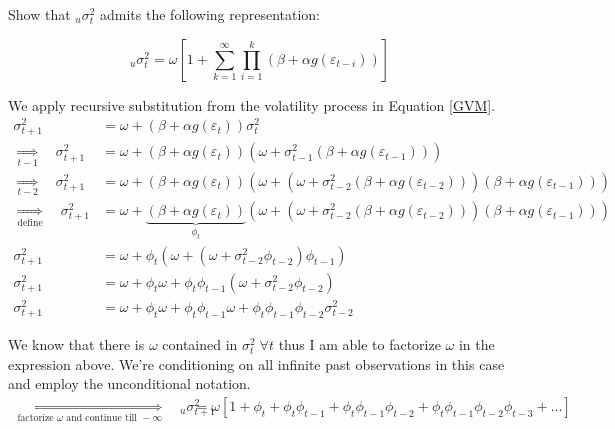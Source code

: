 \documentclass{EconHomework}
\begin{document}
\begin{tcolorbox}[colback=white]
Show that $_{u}\sigma_{t}^{2}$ admits the following representation: 

\begin{equation*}
    _{u}\sigma_{t}^{2}=\omega\left[1+\sum_{k=1}^{\infty}\prod_{i=1}^{k}\left(\beta+\alpha g\left(\varepsilon_{t-i}\right)\right)\right]
\end{equation*}
\end{tcolorbox}


We apply recursive substitution from the volatility process in Equation \ref{GVM}.
\begin{align*}
    \sigma_{t+1}^{2} & =\omega+\left(\beta+\alpha g\left(\varepsilon_{t}\right)\right)\sigma_{t}^{2}\\
    \underset{t-1}{\Longrightarrow}\quad\sigma_{t+1}^{2} & =\omega+\left(\beta+\alpha g\left(\varepsilon_{t}\right)\right)\left(\omega+\sigma_{t-1}^{2}\left(\beta+\alpha g\left(\varepsilon_{t-1}\right)\right)\right)\\
    \underset{t-2}{\Longrightarrow}\quad\sigma_{t+1}^{2} & =\omega+\left(\beta+\alpha g\left(\varepsilon_{t}\right)\right)\left(\omega+\left(\omega+\sigma_{t-2}^{2}\left(\beta+\alpha g\left(\varepsilon_{t-2}\right)\right)\right)\left(\beta+\alpha g\left(\varepsilon_{t-1}\right)\right)\right)\\
    \underset{\text{define}}{\Longrightarrow}\quad\sigma_{t+1}^{2} & =\omega+\underbrace{\left(\beta+\alpha g\left(\varepsilon_{t}\right)\right)}_{\phi_{t}}\left(\omega+\left(\omega+\sigma_{t-2}^{2}\left(\beta+\alpha g\left(\varepsilon_{t-2}\right)\right)\right)\left(\beta+\alpha g\left(\varepsilon_{t-1}\right)\right)\right)\\
    \sigma_{t+1}^{2} & =\omega+\phi_{t}\left(\omega+\left(\omega+\sigma_{t-2}^{2}\phi_{t-2}\right)\phi_{t-1}\right)\\
    \sigma_{t+1}^{2} & =\omega+\phi_{t}\omega+\phi_{t}\phi_{t-1}\left(\omega+\sigma_{t-2}^{2}\phi_{t-2}\right)\\
    \sigma_{t+1}^{2} & =\omega+\phi_{t}\omega+\phi_{t}\phi_{t-1}\omega+\phi_{t}\phi_{t-1}\phi_{t-2}\sigma_{t-2}^{2}
\end{align*}

We know that there is $\omega$ contained in $\sigma_{t}^{2}\;\forall t$
thus I am able to factorize $\omega$ in the expression above. We're
conditioning on all infinite past observations in this case and employ the
unconditional notation.
\begin{align*}
    \underset{\text{factorize }\omega\text{ and continue till }-\infty}{\Longrightarrow}\quad{}_{u}\sigma_{t+1}^{2} & =\omega\left[1+\phi_{t}+\phi_{t}\phi_{t-1}+\phi_{t}\phi_{t-1}\phi_{t-2}+\phi_{t}\phi_{t-1}\phi_{t-2}\phi_{t-3}+\dots\right]
\end{align*}
\end{document}
